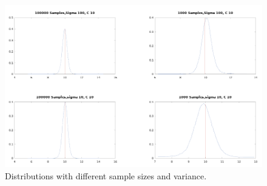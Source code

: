 \begin{figure}[t]
	\includegraphics[width=1\linewidth]{files/curves}
	\caption{Distributions with different sample sizes and variance.}
	\label{img:curves}
\end{figure}